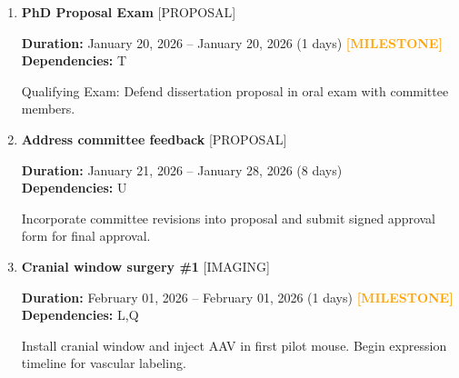 \documentclass[landscape,a4paper]{article}
\begin{document}
\begin{enumerate}[leftmargin=1.5cm, itemsep=1em, parsep=0.5em]
    \item \textcolor{researchcore}{\textbf{\large PhD Proposal Exam}}
          \hfill \textcolor{black!60}{\small [PROPOSAL]}
          
          \vspace{0.2em}
          \textcolor{black!70}{\textbf{Duration:} January 20, 2026 -- January 20, 2026 (1 days)}
          \textcolor{orange}{\textbf{ [MILESTONE]}}\n          \\[0.2em]\textcolor{black!70}{\textbf{Dependencies:} T}\n
          \vspace{0.4em}
          \begin{minipage}[t]{0.9\textwidth}
          \textcolor{black!85}{Qualifying Exam: Defend dissertation proposal in oral exam with committee members.}
          \end{minipage}

    \item \textcolor{researchcore}{\textbf{\large Address committee feedback}}
          \hfill \textcolor{black!60}{\small [PROPOSAL]}
          
          \vspace{0.2em}
          \textcolor{black!70}{\textbf{Duration:} January 21, 2026 -- January 28, 2026 (8 days)}
          \\[0.2em]\textcolor{black!70}{\textbf{Dependencies:} U}\n
          \vspace{0.4em}
          \begin{minipage}[t]{0.9\textwidth}
          \textcolor{black!85}{Incorporate committee revisions into proposal and submit signed approval form for final approval.}
          \end{minipage}

    \item \textcolor{other}{\textbf{\large Cranial window surgery \#1}}
          \hfill \textcolor{black!60}{\small [IMAGING]}
          
          \vspace{0.2em}
          \textcolor{black!70}{\textbf{Duration:} February 01, 2026 -- February 01, 2026 (1 days)}
          \textcolor{orange}{\textbf{ [MILESTONE]}}\n          \\[0.2em]\textcolor{black!70}{\textbf{Dependencies:} L,Q}\n
          \vspace{0.4em}
          \begin{minipage}[t]{0.9\textwidth}
          \textcolor{black!85}{Install cranial window and inject AAV in first pilot mouse. Begin expression timeline for vascular labeling.}
          \end{minipage}


\end{enumerate}
\end{document}
